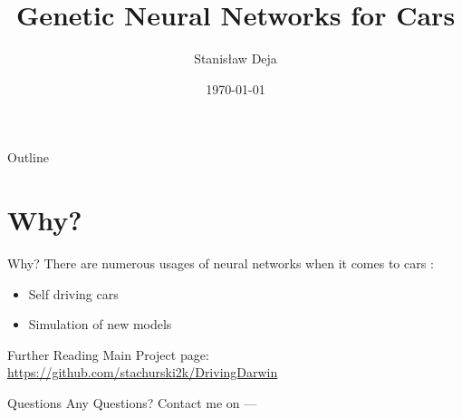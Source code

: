\documentclass{beamer}
\title{Genetic Neural Networks for Cars}
\author{Stanisław Deja}
\date{\today}
\begin{document}
\begin{frame}
  \titlepage
\end{frame}

\begin{frame}{Outline}
  \tableofcontents
\end{frame}

\section{Why?}
\begin{frame}{Why?}
    There are numerous usages of neural networks when it comes to cars :
  \begin{itemize}
    \item Self driving cars
    \item Simulation of new models
  \end{itemize}
\end{frame}

\begin{frame}{Further Reading}
    Main Project page:
 \url{https://github.com/stachurski2k/DrivingDarwin}
\end{frame}

\begin{frame}{Questions}
  \centering
  \Huge
  Any Questions?
  Contact me on ---
\end{frame}
\end{document}
